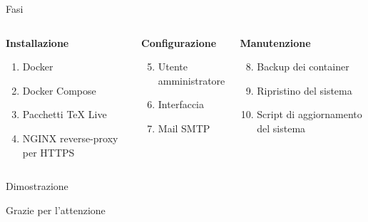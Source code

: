 \documentclass[aspectratio=169]{beamer}
\begin{document}
\begin{frame}{Fasi}
    \begin{columns}[T]
        \begin{column}{0.333\textwidth}
            \textbf{Installazione}
            \begin{enumerate}
                \item Docker
                \item Docker Compose
                \item Pacchetti TeX Live
                \item NGINX reverse-proxy per HTTPS
            \end{enumerate}
       \end{column}
       \begin{column}{0.333\textwidth}
            \textbf{Configurazione}
            \begin{enumerate}\setcounter{enumi}{4}
                \item Utente amministratore
                \item Interfaccia
                \item Mail SMTP
            \end{enumerate}
       \end{column}
       \begin{column}{0.333\textwidth}
            \textbf{Manutenzione}
            \begin{enumerate}\setcounter{enumi}{7}
                \item Backup dei container
                \item Ripristino del sistema
                \item Script di aggiornamento del sistema
            \end{enumerate}
       \end{column}
    \end{columns}
\end{frame}

\begin{frame}{Dimostrazione}

    
\end{frame}

\begin{frame}{}
\centering
\Huge
Grazie per l'attenzione
\end{frame}
\end{document}

